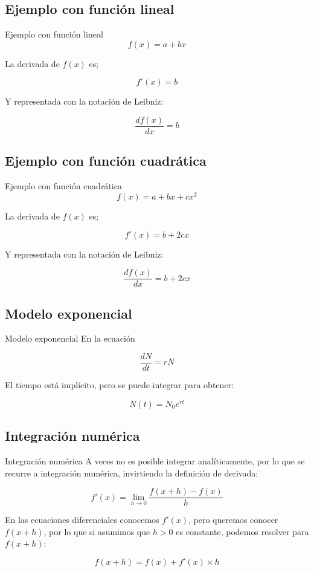 \documentclass[
  11pt,
  ignorenonframetext,
]{beamer}
\begin{document}
\subsection{Ejemplo con función
lineal}\label{ejemplo-con-funciuxf3n-lineal}

\begin{frame}{Ejemplo con función lineal}
\[f(x) = a + bx\]

La derivada de \(f(x)\) es;

\[f'(x) = b\]

Y representada con la notación de Leibniz:

\[\frac{df(x)}{dx} = b\]
\end{frame}

\subsection{Ejemplo con función
cuadrática}\label{ejemplo-con-funciuxf3n-cuadruxe1tica}

\begin{frame}{Ejemplo con función cuadrática}
\[f(x) = a + bx + cx^2\]

La derivada de \(f(x)\) es;

\[f'(x) = b + 2cx\]

Y representada con la notación de Leibniz:

\[\frac{df(x)}{dx} = b + 2cx\]
\end{frame}

\subsection{Modelo exponencial}\label{modelo-exponencial}

\begin{frame}{Modelo exponencial}
En la ecuación

\[\frac{dN}{dt} = r N\]

El tiempo está implícito, pero se puede integrar para obtener:

\[N(t) = N_0 e^{rt}\]
\end{frame}

\subsection{Integración numérica}\label{integraciuxf3n-numuxe9rica}

\begin{frame}{Integración numérica}
A veces no es posible integrar analíticamente, por lo que se recurre a
integración numérica, invirtiendo la definición de derivada:

\[f'(x) = \lim_{h \rightarrow 0} \frac{f(x + h) - f(x)}{h}\]

En las ecuaciones diferenciales conocemos \(f'(x)\), pero queremos
conocer \(f(x + h)\), por lo que si asumimos que \(h > 0\) es constante,
podemos resolver para \(f(x + h)\):

\[f(x + h) = f(x) + f'(x) \times h\]
\end{frame}
\end{document}
